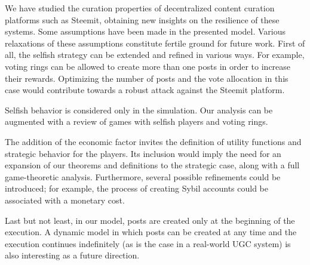 
  We have studied the curation properties of decentralized content curation
  platforms such as Steemit, obtaining new insights on the resilience of these
  systems. Some assumptions have been made in the presented model. Various
  relaxations of these assumptions constitute fertile ground for future work.
  First of all, the selfish strategy can be extended and refined in various
  ways. For example, voting rings can be allowed to create more than one posts
  in order to increase their rewards. Optimizing the number of posts and the
  vote allocation in this case would contribute towards a robust attack against
  the Steemit platform.

  Selfish behavior is considered only in the simulation. Our analysis can be
  augmented with a review of games with selfish players and voting rings.

  The addition of the economic factor invites the definition of utility
  functions and strategic behavior for the players. Its inclusion would imply
  the need for an expansion of our theorems and definitions to the strategic
  case, along with a full game-theoretic analysis. Furthermore, several possible
  refinements could be introduced; for example, the process of creating Sybil
  accounts could be associated with a monetary cost.

  Last but not least, in our model, posts are created only at the beginning of
  the execution. A dynamic model in which posts can be created at any time and
  the execution continues indefinitely (as is the case in a real-world UGC
  system) is also interesting as a future direction.
